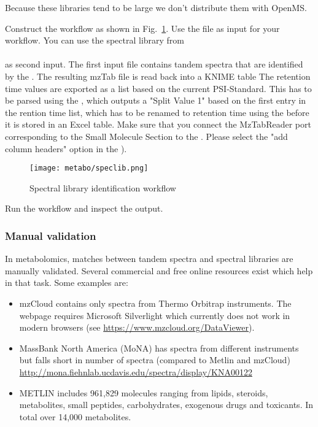 \noindent Because these libraries tend to be large we don't distribute them with OpenMS. 

\begin{task}
Construct the workflow as shown in Fig.~\ref{fig:speclib}.
Use the file  as input for your workflow.  You can use the spectral library from \\
\\ as second input. 
The first input file contains tandem spectra that are identified by the . The resulting mzTab file is read back into a KNIME table
The retention time values are exported as a list based on the current PSI-Standard. This has to be parsed using the , which outputs a "Split Value 1" based on the first entry in the rention time list, which has to be renamed to retention time using the  before it is stored in an Excel table. Make sure that you connect the MzTabReader port corresponding to the Small Molecule Section to the . Please select the "add column headers" option in the ).

\end{task}

\begin{figure}[htbp]
  \centering
  \texttt{[image: metabo/speclib.png]}
  \caption{Spectral library identification workflow}
  \label{fig:speclib}
\end{figure}

Run the workflow and inspect the output.

\subsubsection{Manual validation}

In metabolomics, matches between tandem spectra and spectral libraries are manually validated. Several commercial and free online resources exist which help in that task. Some examples are:

\begin{itemize}
\item mzCloud contains only spectra from Thermo Orbitrap instruments. The webpage requires Microsoft Silverlight which currently does not work in modern browsers (see \url{https://www.mzcloud.org/DataViewer}).
\item MassBank North America (MoNA) has spectra from different instruments but falls short in number of spectra (compared to Metlin and mzCloud) \url{http://mona.fiehnlab.ucdavis.edu/spectra/display/KNA00122}
\item METLIN includes 961,829 molecules ranging from lipids, steroids, metabolites, small peptides, carbohydrates, exogenous drugs and toxicants. In total over 14,000 metabolites.
\end{itemize}

